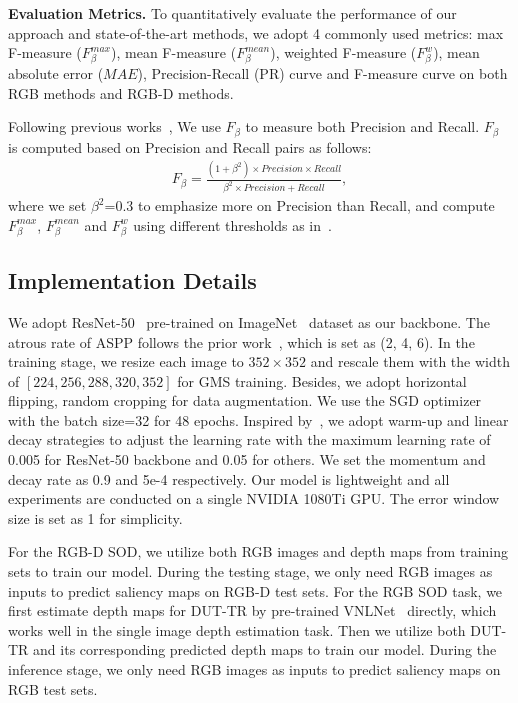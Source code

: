 \documentclass[journal]{IEEEtran}
\begin{document}
\textbf{Evaluation Metrics.} To quantitatively evaluate the performance of our approach and state-of-the-art methods, we adopt 4 commonly used metrics: max F-measure ($F_\beta^{max}$), mean F-measure ($F_\beta^{mean}$), weighted F-measure ($F_\beta^{w}$), mean absolute error ($MAE$), Precision-Recall (PR) curve and F-measure curve on both RGB methods and RGB-D methods.

Following previous works~\cite{oursMM}, We use $F_\beta$ to measure both Precision and Recall. $F_\beta$ is computed based on Precision and Recall pairs as follows:
 \begin{equation} \label{eq:F_beta}
 \begin{split}
 F_\beta = \frac{(1+\beta^2)\times Precision\times Recall}{\beta^2\times Precision + Recall},
 \end{split}
 \end{equation}
 where we set $\beta^2$=0.3 to emphasize more on Precision than Recall, and compute $F_\beta^{max}$, $F_\beta^{mean}$ and $F_\beta^{w}$ using different thresholds as in~\cite{borji2015salient}.




\subsection{Implementation Details}

We adopt ResNet-50~\cite{he2016deep} pre-trained on ImageNet~\cite{deng2009imagenet} dataset as our backbone. The atrous rate of ASPP follows the prior work~\cite{chen2017deeplab}, which is set as (2, 4, 6). In the training stage, we resize each image to $352\times 352$ and rescale them with the width of $[224,
256, 288, 320, 352]$ for GMS training. Besides, we adopt horizontal flipping, random cropping for data augmentation.  We use the SGD optimizer with the batch size=32 for 48 epochs. Inspired by~\cite{F3Net,chen2020global}, we adopt warm-up and linear decay strategies to adjust the learning rate with the maximum learning rate of 0.005 for ResNet-50 backbone and 0.05 for others. We set the momentum and decay rate as 0.9 and 5e-4 respectively. Our model is lightweight and all experiments are conducted on a single NVIDIA 1080Ti GPU.  The error window size is set as 1 for simplicity.

For the RGB-D SOD, we utilize both RGB images and depth maps from training sets to train our model. During the testing stage, we only need RGB images as inputs to predict saliency maps on RGB-D test sets. For the RGB SOD task, we first estimate depth maps for DUT-TR by pre-trained VNLNet~\cite{yin2019enforcing} directly, which works well in the single image depth estimation task. Then we utilize both DUT-TR and its corresponding predicted depth maps to train our model. During the inference stage, we only need RGB images as inputs to predict saliency maps on RGB test sets.
\end{document}
